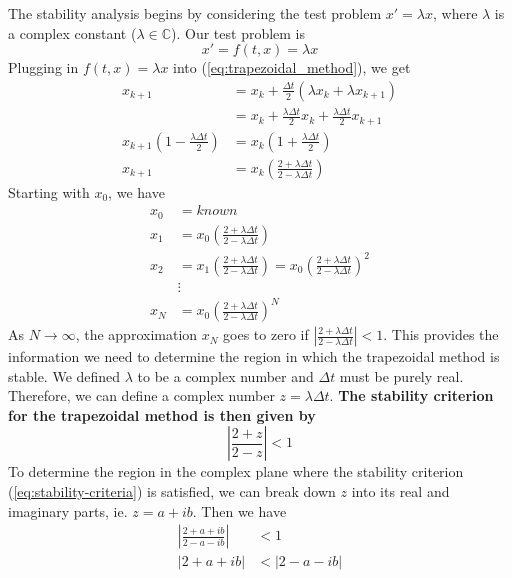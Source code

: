 \documentclass{article}
\begin{document}
The stability analysis begins by considering the test problem $x' = \lambda x$, where $\lambda$ is a complex constant ($\lambda \in \mathbb{C}$).  Our test problem is
\begin{equation} \label{eq:test-problem}
x' = f(t, x) = \lambda x
\end{equation}
Plugging in $f(t, x) = \lambda x$ into (\ref{eq:trapezoidal_method}), we get
\begin{equation}
\begin{split}
x_{k+1} & = x_k + \frac{\Delta t}{2}(\lambda x_k + \lambda x_{k+1}) \\
& = x_k + \frac{\lambda \Delta t}{2}x_k + \frac{\lambda \Delta t}{2}x_{k+1} \\
x_{k+1}(1 - \frac{\lambda \Delta t}{2}) & = x_k(1 + \frac{\lambda \Delta t}{2}) \\
x_{k+1} &= x_k(\frac{2 + \lambda \Delta t}{2 - \lambda \Delta t})
\end{split}
\end{equation}
Starting with $x_0$, we have
\begin{equation}
\begin{split}
x_0 & = known \\
x_1 & = x_0(\frac{2 + \lambda \Delta t}{2 - \lambda \Delta t}) \\
x_2 & = x_1(\frac{2 + \lambda \Delta t}{2 - \lambda \Delta t})  = x_0(\frac{2 + \lambda \Delta t}{2 - \lambda \Delta t})^2 \\
& \vdots \\
x_N & = x_0(\frac{2 + \lambda \Delta t}{2 - \lambda \Delta t})^N
\end{split}
\end{equation}
As $N \rightarrow \infty$, the approximation $x_N$ goes to zero if $|\frac{2 + \lambda \Delta t}{2 - \lambda \Delta t}| < 1$. This provides the information we need to determine the region in which the trapezoidal method is stable. We defined $\lambda$ to be a complex number and $\Delta t$ must be purely real.  Therefore, we can define a complex number $z = \lambda \Delta t$.  \textbf{The stability criterion for the trapezoidal method is then given by}
\begin{equation} \label{eq:stability-criteria}
\left|\frac{2 + z}{2 - z} \right| < 1
\end{equation}
To determine the region in the complex plane where the stability criterion (\ref{eq:stability-criteria}) is satisfied, we can break down $z$ into its real and imaginary parts, ie. $z = a + ib$.  Then we have
\begin{equation}
\begin{split}
\left|\frac{2 + a + ib}{2 - a - ib} \right| & < 1 \\
\left|2 + a + ib\right| & < \left|2 - a - ib\right|
\end{split}
\end{equation}
\end{document}
